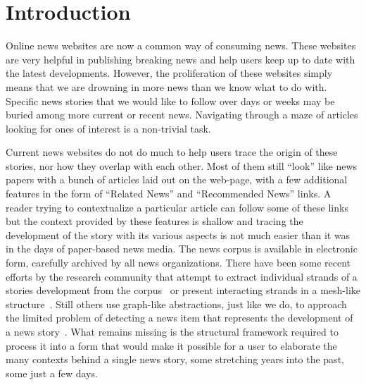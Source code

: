 \section{Introduction}
Online news websites are now a common way of consuming news. These
websites are very helpful in publishing breaking news and help users
keep up to date with the latest developments. However, the
proliferation of these websites simply means that we are drowning in
more news than we know what to do with. Specific news stories that we
would like to follow over days or weeks may be buried among more
current or recent news. Navigating through a maze of articles looking
for ones of interest is a non-trivial task.  

Current news websites do not do much to help users trace the origin of
these stories, nor how they overlap with each other. Most of them
still ``look'' like news papers with a bunch of articles laid out on
the web-page, with a few additional features in the form of ``Related
News'' and ``Recommended News'' links. A reader trying to
contextualize a particular article can follow some of these links but
the context provided by these features is shallow and tracing the
development of the story with its various aspects is not much easier
than it was in the days of paper-based news media. The news corpus is
available in electronic form, carefully archived by all news
organizations. There have been some recent efforts by the research
community that attempt to extract individual strands of a stories
development from the corpus~\cite{shahaf@kdd2010} or present
interacting strands in a mesh-like
structure~\cite{shahaf@www2012}. Still others use graph-like
abstractions, just like we do, to approach the limited problem of
detecting a news item that represents the development of a news
story~\cite{subasic-icdm:2008,subasic-ida:2013}. What remains missing
is the structural framework required to process it into a form that
would make it possible for a user to elaborate the many contexts
behind a single news story, some stretching years into the past, some
just a few days. 

